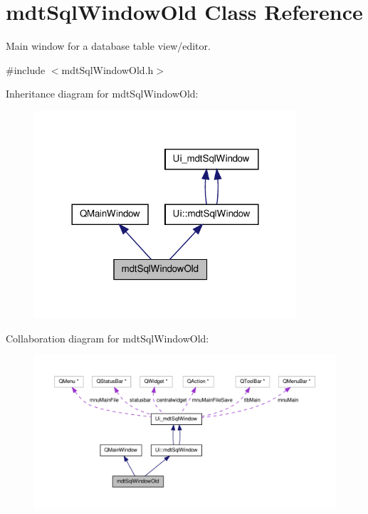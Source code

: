 \hypertarget{classmdt_sql_window_old}{\section{mdt\-Sql\-Window\-Old Class Reference}
\label{classmdt_sql_window_old}
}


Main window for a database table view/editor.  




{\ttfamily \#include $<$mdt\-Sql\-Window\-Old.\-h$>$}



Inheritance diagram for mdt\-Sql\-Window\-Old\-:\nopagebreak
\begin{figure}[H]
\begin{center}
\leavevmode
\includegraphics[width=276pt]{classmdt_sql_window_old__inherit__graph}
\end{center}
\end{figure}


Collaboration diagram for mdt\-Sql\-Window\-Old\-:\nopagebreak
\begin{figure}[H]
\begin{center}
\leavevmode
\includegraphics[width=350pt]{classmdt_sql_window_old__coll__graph}
\end{center}
\end{figure}
